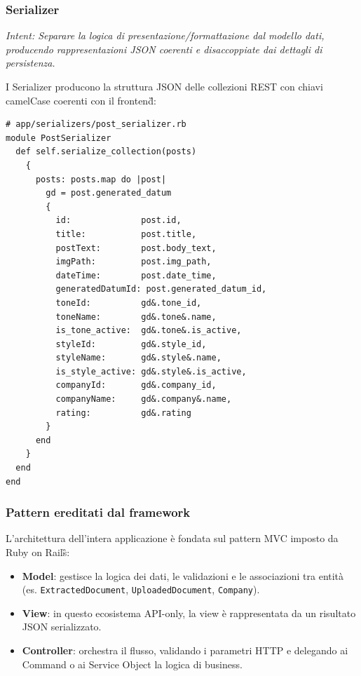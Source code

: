 \documentclass[a4paper,11pt]{article}
\newcommand{\code}[1]{\texttt{#1}}
\begin{document}
\subsubsection{Serializer}

\textit{Intent: Separare la logica di presentazione/formattazione dal modello dati,
producendo rappresentazioni JSON coerenti e disaccoppiate dai dettagli
di persistenza.}

I Serializer producono la struttura JSON delle collezioni REST con
chiavi camelCase coerenti con il frontend\G{}:

\begin{lstlisting}[caption={PostSerializer -- serializzazione con join eagerly loaded}]
# app/serializers/post_serializer.rb
module PostSerializer
  def self.serialize_collection(posts)
    {
      posts: posts.map do |post|
        gd = post.generated_datum
        {
          id:              post.id,
          title:           post.title,
          postText:        post.body_text,
          imgPath:         post.img_path,
          dateTime:        post.date_time,
          generatedDatumId: post.generated_datum_id,
          toneId:          gd&.tone_id,
          toneName:        gd&.tone&.name,
          is_tone_active:  gd&.tone&.is_active,
          styleId:         gd&.style_id,
          styleName:       gd&.style&.name,
          is_style_active: gd&.style&.is_active,
          companyId:       gd&.company_id,
          companyName:     gd&.company&.name,
          rating:          gd&.rating
        }
      end
    }
  end
end
\end{lstlisting}

\subsubsection{Pattern ereditati dal framework}


L'architettura dell'intera applicazione è fondata sul pattern MVC imposto
da Ruby on Rails\G{}:

\begin{itemize}[noitemsep]
  \item \textbf{Model}: gestisce la logica dei dati, le validazioni e le
        associazioni tra entità (es. \code{ExtractedDocument},
        \code{UploadedDocument}, \code{Company}).
  \item \textbf{View}: in questo ecosistema API-only, la view è rappresentata da un risultato JSON serializzato.
  \item \textbf{Controller}: orchestra il flusso, validando i parametri HTTP
        e delegando ai Command o ai Service Object la logica di business.
\end{itemize}
\end{document}
